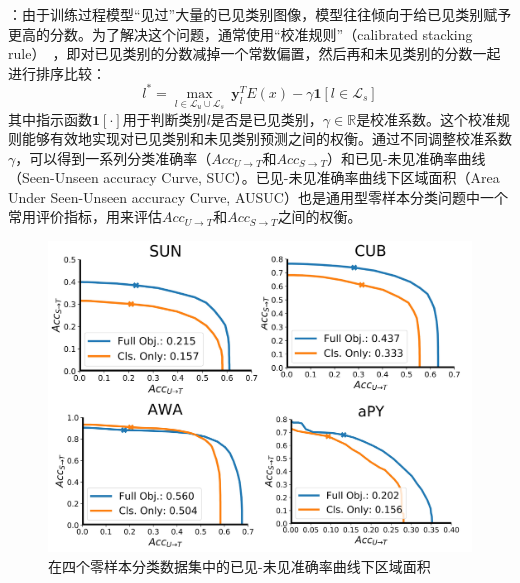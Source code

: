 \textbf{}：由于训练过程模型“见过”大量的已见类别图像，模型往往倾向于给已见类别赋予更高的分数。为了解决这个问题，通常使用“校准规则”（calibrated stacking rule）~\cite{chao2016empirical}，即对已见类别的分数减掉一个常数偏置，然后再和未见类别的分数一起进行排序比较：
\begin{equation} \label{ch3:eq:eq_8}
    l^* = \max_{l\in \mathcal{L}_u \cup \mathcal{L}_s }~\bm{y}^T_l E(x) - \gamma \mathbf{1} \left[ l \in \mathcal{L}_s \right]
\end{equation}
其中指示函数$\mathbf{1} \left[ \cdot \right]$用于判断类别$l$是否是已见类别，$\gamma \in \mathbb{R}$是校准系数。这个校准规则能够有效地实现对已见类别和未见类别预测之间的权衡。通过不同调整校准系数$\gamma$，可以得到一系列分类准确率（$Acc_{U \to T}$和$Acc_{S \to T}$）和已见-未见准确率曲线（Seen-Unseen accuracy Curve, SUC）。已见-未见准确率曲线下区域面积（Area Under Seen-Unseen accuracy Curve, AUSUC）也是通用型零样本分类问题中一个常用评价指标，用来评估$Acc_{U \to T}$和$Acc_{S \to T}$之间的权衡。

\begin{figure}[t]
    \centering
    \includegraphics[width=0.7\linewidth]{chapter3/res/ausuc.pdf}
    \caption{在四个零样本分类数据集中的已见-未见准确率曲线下区域面积}
\label{ch3:fig:ausuc}
\end{figure}


